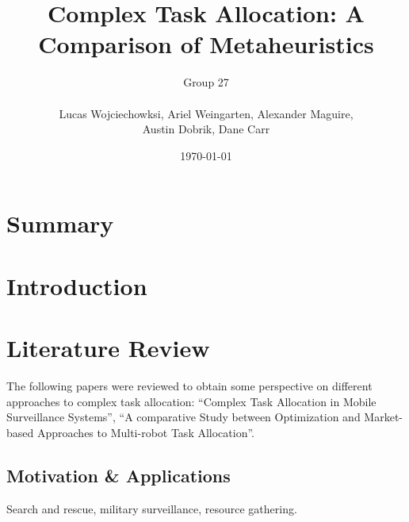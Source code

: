 \documentclass[a4paper]{article}
\title{Complex Task Allocation: A Comparison of Metaheuristics}
\author{
	Group 27 \\
	\\
	Lucas Wojciechowksi, Ariel Weingarten, Alexander Maguire, \\
	Austin Dobrik, Dane Carr}
\date{\today}
\begin{document}
\maketitle


\section*{Summary}


\section{Introduction}



\section{Literature Review}
The following papers were reviewed to obtain some perspective on different approaches to complex task allocation:
``Complex Task Allocation in Mobile Surveillance Systems'', ``A comparative Study between Optimization and
Market-based Approaches to Multi-robot Task Allocation''.

\subsection{Motivation \& Applications}
Search and rescue, military surveillance, resource gathering.
\end{document}
